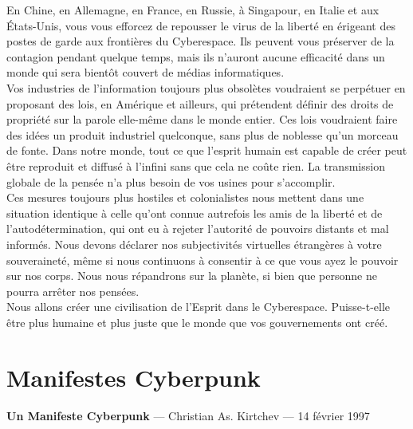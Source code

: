 \documentclass[11pt,twoside,a4paper]{book}
\begin{document}
\begin{center}
\begin{minipage}[ht]{0.95\textwidth}
	En Chine, en Allemagne, en France, en Russie, {\`a} Singapour, en Italie et aux {\'E}tats-Unis, vous vous efforcez de repousser le virus de la libert{\'e} en {\'e}rigeant des postes de garde aux fronti{\`e}res du Cyberespace. Ils peuvent vous pr{\'e}server de la contagion pendant quelque temps, mais ils n'auront aucune efficacit{\'e} dans un monde qui sera bient{\^o}t couvert de m{\'e}dias informatiques. ~\\
	
	Vos industries de l'information toujours plus obsol{\`e}tes voudraient se perp{\'e}tuer en proposant des lois, en Am{\'e}rique et ailleurs, qui pr{\'e}tendent d{\'e}finir des droits de propri{\'e}t{\'e} sur la parole elle-m{\^e}me dans le monde entier. Ces lois voudraient faire des id{\'e}es un produit industriel quelconque, sans plus de noblesse qu'un morceau de fonte. Dans notre monde, tout ce que l'esprit humain est capable de cr{\'e}er peut {\^e}tre reproduit et diffus{\'e} {\`a} l'infini sans que cela ne co{\^u}te rien. La transmission globale de la pens{\'e}e n'a plus besoin de vos usines pour s'accomplir. ~\\
	
	Ces mesures toujours plus hostiles et colonialistes nous mettent dans une situation identique {\`a} celle qu'ont connue autrefois les amis de la libert{\'e} et de l'autod{\'e}termination, qui ont eu {\`a} rejeter l'autorit{\'e} de pouvoirs distants et mal inform{\'e}s. Nous devons d{\'e}clarer nos subjectivit{\'e}s virtuelles {\'e}trang{\`e}res {\`a} votre souverainet{\'e}, m{\^e}me si nous continuons {\`a} consentir {\`a} ce que vous ayez le pouvoir sur nos corps. Nous nous r{\'e}pandrons sur la plan{\`e}te, si bien que personne ne pourra arr{\^e}ter nos pens{\'e}es. ~\\
	
	Nous allons cr{\'e}er une civilisation de l'Esprit dans le Cyberespace. Puisse-t-elle {\^e}tre plus humaine et plus juste que le monde que vos gouvernements ont cr{\'e}{\'e}. ~\\
\end{minipage} \end{center}

\clearpage

\section{Manifestes Cyberpunk}

\textbf{\Large Un Manifeste Cyberpunk} --- Christian As. Kirtchev --- 14 f{\'e}vrier 1997 %
\end{document}
